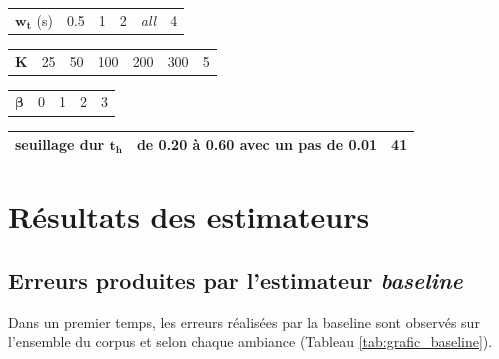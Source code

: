 \begin{table}[t]
\begin{tabularx}{17.5cm}{L{3cm}@{}C{3cm}@{}@{}C{3cm}@{}@{}C{3cm}@{}@{}C{3cm}@{}C{2cm}@{}}
    $\mathbf{w_t}$ (s)& 0.5 & 1 & 2 & \textit{all} & 4\\
\end{tabularx}

\begin{tabularx}{17.5cm}{L{3cm}@{}C{2.4cm}@{}@{}C{2.4cm}@{}@{}C{2.4cm}@{}@{}C{2.4cm}@{}@{}C{2.4cm}@{}C{2cm}@{}}
    $\mathbf{K}$ & 25 & 50 & 100 & 200 & 300 & 5\\
\end{tabularx}

\begin{tabularx}{17.5cm}{L{3cm}@{}C{4cm}@{}@{}C{4cm}@{}@{}C{4cm}@{}C{2cm}@{}}
   $\mathbf{\beta}$ & 0 & 1 & 2 & 3\\
\end{tabularx}

\begin{tabularx}{17.5cm}{L{3cm}@{}C{12cm}@{}C{2cm}@{}}
   seuillage dur $\mathbf{t_h}$ & de 0.20 à 0.60 avec un pas de 0.01 & 41\\
   \bottomrule
\end{tabularx}
\label{tab:experimental_factorsNMF}
\end{table}

\section{Résultats des estimateurs}

\subsection{Erreurs produites par l'estimateur \textit{baseline}}
Dans un premier temps, les erreurs réalisées par la baseline sont observés sur l'ensemble du corpus et selon chaque ambiance (Tableau \ref{tab:grafic_baseline}).

